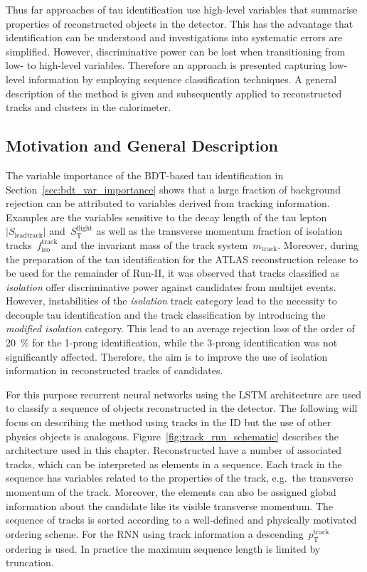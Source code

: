 Thus far approaches of tau identification use high-level variables that
summarise properties of reconstructed objects in the detector. This has the
advantage that identification can be understood and investigations into
systematic errors are simplified. However, discriminative power can be lost when
transitioning from low- to high-level variables. Therefore an approach is
presented capturing low-level information by employing sequence classification
techniques. A general description of the method is given and subsequently
applied to reconstructed tracks and clusters in the calorimeter.

\subsection{Motivation and General Description}
\label{sec:rnn_descr}

The variable importance of the BDT-based tau identification in
Section~\ref{sec:bdt_var_importance} shows that a large fraction of background
rejection can be attributed to variables derived from tracking information.
Examples are the variables sensitive to the decay length of the tau
lepton~$|S_\text{leadtrack}|$ and~$S_\text{T}^\text{flight}$ as well as the
transverse momentum fraction of isolation tracks~$f_\text{iso}^\text{track}$ and
the invariant mass of the track system~$m_\text{track}$. Moreover, during the
preparation of the tau identification for the ATLAS reconstruction release to be
used for the remainder of Run-II, it was observed that tracks classified as
\emph{isolation} offer discriminative power against \tauhadvis candidates from
multijet events. However, instabilities of the \emph{isolation} track category
lead to the necessity to decouple tau identification and the track
classification by introducing the \emph{modified isolation} category. This lead
to an average rejection loss of the order of \SI{20}{\percent} for the 1-prong
identification, while the 3-prong identification was not significantly affected.
Therefore, the aim is to improve the use of isolation information in
reconstructed tracks of \tauhadvis candidates.

For this purpose recurrent neural networks using the LSTM architecture are used
to classify a sequence of objects reconstructed in the detector. The following
will focus on describing the method using tracks in the ID but the use of other
physics objects is analogous. Figure~\ref{fig:track_rnn_schematic} describes the
architecture used in this chapter. Reconstructed \tauhadvis have a number of
associated tracks, which can be interpreted as elements in a sequence. Each
track in the sequence has variables related to the properties of the track,
e.g.\ the transverse momentum of the track. Moreover, the elements can also be
assigned global information about the \tauhadvis candidate like its visible
transverse momentum. The sequence of tracks is sorted according to a
well-defined and physically motivated ordering scheme. For the RNN using track
information a descending~$p_\text{T}^\text{track}$ ordering is used.  In practice the maximum sequence length is limited by
truncation.

